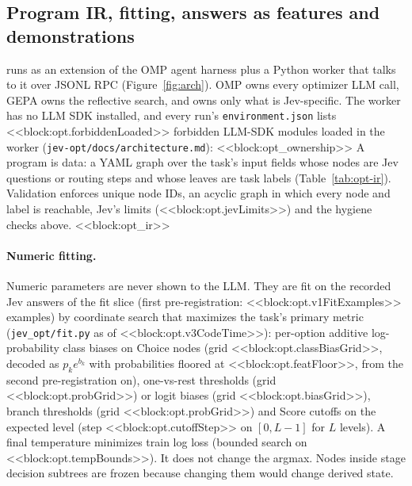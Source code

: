 \subsection{Program IR, fitting, answers as features and demonstrations}\label{app:opt-ir}
\jevopt{} runs as an extension of the OMP agent harness plus a Python worker that talks to it over JSONL RPC (Figure~\ref{fig:arch}). OMP owns every optimizer LLM call, GEPA owns the reflective search, and \jevopt{} owns only what is Jev-specific. The worker has no LLM SDK installed, and every run's \texttt{environment.json} lists <<block:opt.forbiddenLoaded>> forbidden LLM-SDK modules loaded in the worker (\texttt{jev-opt/\allowbreak docs/\allowbreak architecture.md}):
<<block:opt_ownership>>
A \jevopt{} program is data: a YAML graph over the task's input fields whose nodes are Jev questions or routing steps and whose leaves are task labels (Table~\ref{tab:opt-ir}). Validation enforces unique node IDs, an acyclic graph in which every node and label is reachable, Jev's limits (<<block:opt.jevLimits>>) and the hygiene checks above.
<<block:opt_ir>>

\paragraph{Numeric fitting.}
Numeric parameters are never shown to the LLM. They are fit on the recorded Jev answers of the fit slice (first pre-registration: <<block:opt.v1FitExamples>> examples) by coordinate search that maximizes the task's primary metric (\texttt{jev\_opt/\allowbreak fit.py} as of <<block:opt.v3CodeTime>>): per-option additive log-probability class biases on Choice nodes (grid <<block:opt.classBiasGrid>>, decoded as $p_k e^{b_k}$ with probabilities floored at <<block:opt.featFloor>>, from the second pre-registration on), one-vs-rest thresholds (grid <<block:opt.probGrid>>) or logit biases (grid <<block:opt.biasGrid>>), branch thresholds (grid <<block:opt.probGrid>>) and Score cutoffs on the expected level (step <<block:opt.cutoffStep>> on $[0, L{-}1]$ for $L$ levels). A final temperature minimizes train log loss (bounded search on <<block:opt.tempBounds>>). It does not change the argmax. Nodes inside stage decision subtrees are frozen because changing them would change derived state.


